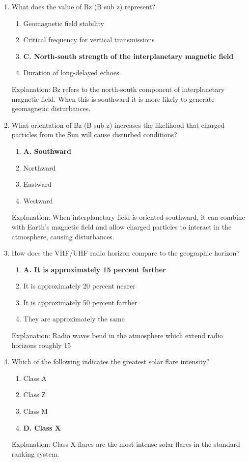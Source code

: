 \begin{enumerate}
        \item What does the value of Bz (B sub z) represent?
         \begin{enumerate}
        \item  Geomagnetic field stability
      \item  Critical frequency for vertical transmissions
    \item \textbf{C. North-south strength of the interplanetary magnetic field}
        \item  Duration of long-delayed echoes
        \end{enumerate}
        \textcolor{myred}{Explanation:}
          Bz refers to the north-south component of interplanetary magnetic field. When this is southward it is more likely to generate geomagnetic disturbances.
    
       \item What orientation of Bz (B sub z) increases the likelihood that charged particles from the Sun will cause disturbed conditions?
    \begin{enumerate}
        \item \textbf{A. Southward}
       \item  Northward
         \item  Eastward
         \item  Westward
        \end{enumerate}
   \textcolor{myred}{Explanation:}
       When interplanetary field is oriented southward, it can combine with Earth's magnetic field and allow charged particles to interact in the atmosphere, causing disturbances.
        
        \item How does the VHF/UHF radio horizon compare to the geographic horizon?
        \begin{enumerate}
        \item \textbf{A. It is approximately 15 percent farther}
      \item  It is approximately 20 percent nearer
        \item  It is approximately 50 percent farther
       \item  They are approximately the same
        \end{enumerate}
      \textcolor{myred}{Explanation:}
    Radio waves bend in the atmosphere which extend radio horizons roughly 15%

    \item Which of the following indicates the greatest solar flare intensity?
       \begin{enumerate}
        \item  Class A
       \item  Class Z
       \item  Class M
         \item \textbf{D. Class X}
        \end{enumerate}
      \textcolor{myred}{Explanation:}
       Class X flares are the most intense solar flares in the standard ranking system.
       

\end{enumerate}
